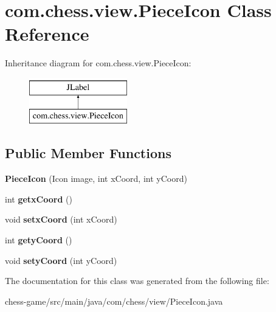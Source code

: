 \hypertarget{classcom_1_1chess_1_1view_1_1_piece_icon}{}\section{com.\+chess.\+view.\+Piece\+Icon Class Reference}
\label{classcom_1_1chess_1_1view_1_1_piece_icon}
Inheritance diagram for com.\+chess.\+view.\+Piece\+Icon\+:\begin{figure}[H]
\begin{center}
\leavevmode
\includegraphics[height=2.000000cm]{classcom_1_1chess_1_1view_1_1_piece_icon}
\end{center}
\end{figure}
\subsection*{Public Member Functions}
\begin{DoxyCompactItemize}
\item 
\mbox{\label{classcom_1_1chess_1_1view_1_1_piece_icon_aa503af724586f171f20c59e43b6b377b}} 
{\bfseries Piece\+Icon} (Icon image, int x\+Coord, int y\+Coord)
\item 
\mbox{\label{classcom_1_1chess_1_1view_1_1_piece_icon_aee1374a31f6557a4f9ecb25cd1872da1}} 
int {\bfseries getx\+Coord} ()
\item 
\mbox{\label{classcom_1_1chess_1_1view_1_1_piece_icon_a0072073089723773a533a169b7e60edc}} 
void {\bfseries setx\+Coord} (int x\+Coord)
\item 
\mbox{\label{classcom_1_1chess_1_1view_1_1_piece_icon_a4f451e33aba4da22fd3fded5be9e82bd}} 
int {\bfseries gety\+Coord} ()
\item 
\mbox{\label{classcom_1_1chess_1_1view_1_1_piece_icon_a3af12af2e50c5ac5aee5a94ddb90d61b}} 
void {\bfseries sety\+Coord} (int y\+Coord)
\end{DoxyCompactItemize}


The documentation for this class was generated from the following file\+:\begin{DoxyCompactItemize}
\item 
chess-\/game/src/main/java/com/chess/view/Piece\+Icon.\+java\end{DoxyCompactItemize}

